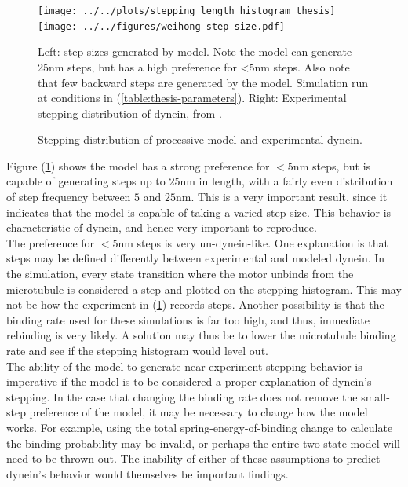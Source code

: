 \documentclass[
11pt, %
english, %
singlespacing, %
headsepline, %
chapterinoneline, %
]{MastersDoctoralThesis} %
\begin{document}
\begin{figure}[H]
  \centering
    \texttt{[image: ../../plots/stepping\_length\_histogram\_thesis]}%
    \texttt{[image: ../../figures/weihong-step-size.pdf]}
    \caption{Stepping distribution of processive model and experimental dynein.}{Left: step sizes generated by model. Note the model can generate 25nm steps, but has a high preference for <5nm steps. Also note that few backward steps are generated by the model. Simulation run at conditions in (\ref{table:thesis-parameters}). Right: Experimental stepping distribution of dynein, from \cite{weihongpaper}.}
    \label{fig:final-histograms}
\end{figure}

Figure (\ref{fig:final-histograms}) shows the model has a strong preference for $<5$nm steps, but is capable of generating steps up to $25$nm in length, with a fairly even distribution of step frequency between $5$ and $25$nm. This is a very important result, since it indicates that the model is capable of taking a varied step size. This behavior is characteristic of dynein, and hence very important to reproduce.\\

The preference for $<5$nm steps is very un-dynein-like. One explanation is that steps may be defined differently between experimental and modeled dynein. In the simulation, every state transition where the motor unbinds from the microtubule is considered a step and plotted on the stepping histogram. This may not be how the experiment in (\ref{fig:final-histograms}) records steps. Another possibility is that the binding rate used for these simulations is far too high, and thus, immediate rebinding is very likely. A solution may thus be to lower the microtubule binding rate and see if the stepping histogram would level out.\\

The ability of the model to generate near-experiment stepping behavior is imperative if the model is to be considered a proper explanation of dynein's stepping. In the case that changing the binding rate does not remove the small-step preference of the model, it may be necessary to change how the model works. For example, using the total spring-energy-of-binding change to calculate the binding probability may be invalid, or perhaps the entire two-state model will need to be thrown out. The inability of either of these assumptions to predict dynein's behavior would themselves be important findings.\\
\end{document}
